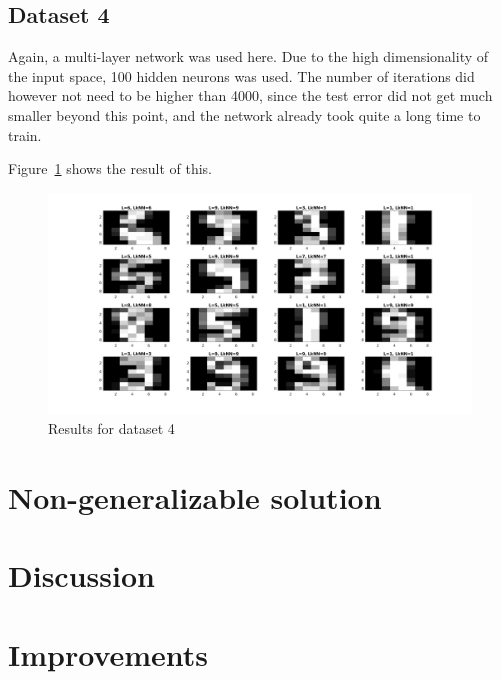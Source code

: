 \documentclass{article}
\begin{document}
% 
% 

\subsection{Dataset 4}

Again, a multi-layer network was used here. Due to the high dimensionality of
the input space, 100 hidden neurons was used. The number of
iterations did however not need to be higher than 4000, since the test error
did not get much smaller beyond this point, and the network already took quite
a long time to train.

Figure~\ref{fig:res4} shows the result of this.

\begin{figure}
    \includegraphics[width=13cm]{dataset4res.png}
    \caption{Results for dataset 4}
    \label{fig:res4}
\end{figure}

\section{Non-generalizable solution}

\section{Discussion}

\section{Improvements}
\end{document}
